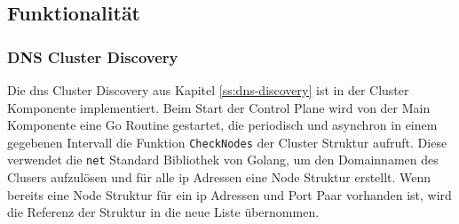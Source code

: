 \subsection{Funktionalität}

\subsubsection{DNS Cluster Discovery}
Die \ac{dns} Cluster Discovery aus Kapitel \ref{ss:dns-discovery} ist in der Cluster Komponente implementiert.
Beim Start der Control Plane wird von der Main Komponente eine Go Routine gestartet, die periodisch und asynchron in einem gegebenen Intervall die Funktion \verb|CheckNodes| der Cluster Struktur aufruft. Diese verwendet die \verb|net| Standard Bibliothek von Golang, um den Domainnamen des Clusers aufzulösen und für alle \ac{ip} Adressen eine Node Struktur erstellt. Wenn bereits eine Node Struktur für ein \ac{ip} Adressen und Port Paar vorhanden ist, wird die Referenz der Struktur in die neue Liste übernommen.

